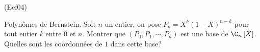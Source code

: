 \begin{tiny}(Eef04)\end{tiny} Polynômes de Bernstein.\newline
Soit $n$ un entier, on pose $P_{k}=X^{k}(1-X)^{n-k}$ pour tout entier $k$ entre $0$ et $n$. Montrer que $(P_{0},P_{1},\cdots ,P_{n})$ est une base de $\C_{n}\left[ X\right]$. Quelles sont les coordonnées de $1$ dans cette base?
